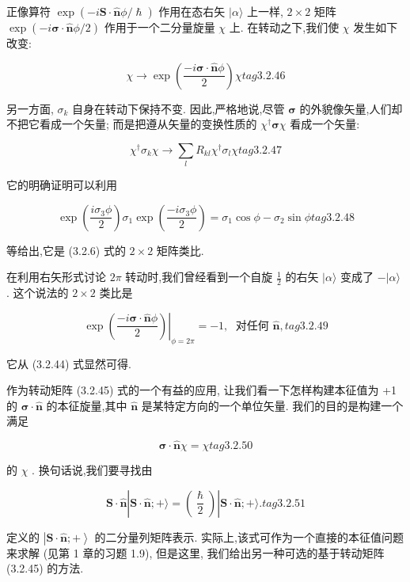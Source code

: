 正像算符 $\exp \left( {-i\mathbf{S} \cdot \widehat{\mathbf{n}}\phi /\hslash }\right)$ 作用在态右矢 $|\alpha \rangle$ 上一样, $2 \times 2$ 矩阵 $\exp \left( {-i\mathbf{\sigma } \cdot \widehat{\mathbf{n}}\phi /2}\right)$ 作用于一个二分量旋量 $\chi$ 上. 在转动之下,我们使 $\chi$ 发生如下改变:

$$
\chi \rightarrow \exp \left( \frac{-i\mathbf{\sigma } \cdot \widehat{\mathbf{n}}\phi }{2}\right) \chi tag{3.2.46}
$$

另一方面, ${\sigma }_{k}$ 自身在转动下保持不变. 因此,严格地说,尽管 $\mathbf{\sigma }$ 的外貌像矢量,人们却不把它看成一个矢量; 而是把遵从矢量的变换性质的 ${\chi }^{ \dagger }\mathbf{\sigma }\chi$ 看成一个矢量:

$$
{\chi }^{ \dagger }{\sigma }_{k}\chi \rightarrow \mathop{\sum }\limits_{l}{R}_{kl}{\chi }^{ \dagger }{\sigma }_{l}\chi tag{3.2.47}
$$

它的明确证明可以利用

$$
\exp \left( \frac{i{\sigma }_{3}\phi }{2}\right) {\sigma }_{1}\exp \left( \frac{-i{\sigma }_{3}\phi }{2}\right) = {\sigma }_{1}\cos \phi - {\sigma }_{2}\sin \phi tag{3. 2.48}
$$

等给出,它是 (3.2.6) 式的 $2 \times 2$ 矩阵类比.

在利用右矢形式讨论 ${2\pi }$ 转动时,我们曾经看到一个自旋 $\frac{1}{2}$ 的右矢 $|\alpha \rangle$ 变成了 $- |\alpha \rangle$ . 这个说法的 $2 \times 2$ 类比是

$$
{\left. \exp \left( \frac{-i\mathbf{\sigma } \cdot \widehat{\mathbf{n}}\phi }{2}\right) \right| }_{\phi = {2\pi }} = - 1,\;\text{ 对任何 }\widehat{\mathbf{n}}, tag{3.2.49}
$$

它从 (3.2.44) 式显然可得.

作为转动矩阵 (3.2.45) 式的一个有益的应用, 让我们看一下怎样构建本征值为 +1 的 $\mathbf{\sigma } \cdot \widehat{\mathbf{n}}$ 的本征旋量,其中 $\widehat{\mathbf{n}}$ 是某特定方向的一个单位矢量. 我们的目的是构建一个满足

$$
\mathbf{\sigma } \cdot \widehat{\mathbf{n}}\chi = \chi tag{3. 2.50}
$$

的 $\chi$ . 换句话说,我们要寻找由

$$
\mathbf{S} \cdot \widehat{\mathbf{n}}\left| {\mathbf{S} \cdot \widehat{\mathbf{n}}; + \rangle = \left( \frac{\hslash }{2}\right) }\right| \mathbf{S} \cdot \widehat{\mathbf{n}}; + \rangle . tag{3. 2.51}
$$

定义的 $\left| {\mathbf{S} \cdot \widehat{\mathbf{n}}; + }\right\rangle$ 的二分量列矩阵表示. 实际上,该式可作为一个直接的本征值问题来求解 (见第 1 章的习题 1.9), 但是这里, 我们给出另一种可选的基于转动矩阵 (3.2.45) 的方法.


